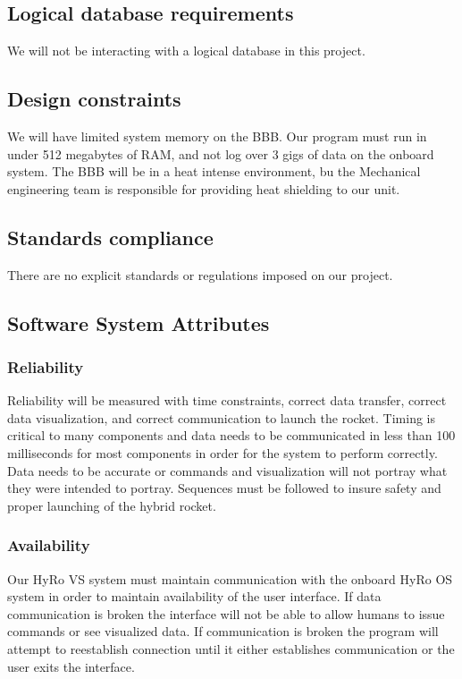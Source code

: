 \documentclass[10pt,draftclsnofoot,onecolumn,compsoc]{IEEEtran}
\begin{document}
\subsection{Logical database requirements}
We will not be interacting with a logical database in this project.

\subsection{Design constraints}
We will have limited system memory on the BBB. Our program must run in under 512 megabytes of RAM, and not log over 3 gigs of data on the onboard system. The BBB will be in a heat intense environment, bu the Mechanical engineering team is responsible for providing heat shielding to our unit.

\subsection{Standards compliance}
There are no explicit standards or regulations imposed on our project.

\subsection{Software System Attributes}
\subsubsection{Reliability} Reliability will be measured with time constraints, correct data transfer, correct data visualization, and correct communication to launch the rocket. Timing is critical to many components and data needs to be communicated in less than 100 milliseconds for most components in order for the system to perform correctly. Data needs to be accurate or commands and visualization will not portray what they were intended to portray. Sequences must be followed to insure safety and proper launching of the hybrid rocket.
\subsubsection{Availability}
Our HyRo VS system must maintain communication with the onboard HyRo OS system in order to maintain availability of the user interface. If data communication is broken the interface will not be able to allow humans to issue commands or see visualized data. If communication is broken the program will attempt to reestablish connection until it either establishes communication or the user exits the interface.
\end{document}
